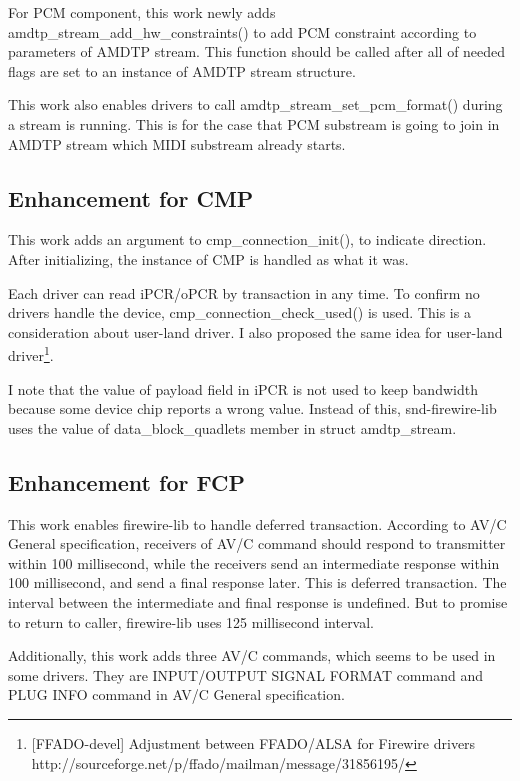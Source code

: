 \documentclass[onecolumn]{article}
\begin{document}
For PCM component, this work newly adds amdtp\_stream\_add\_hw\_constraints() to add PCM constraint according to parameters of AMDTP stream. This function should be called after all of needed flags are set to an instance of AMDTP stream structure.

This work also enables drivers to call amdtp\_stream\_set\_pcm\_format() during a stream is running. This is for the case that PCM substream is going to join in AMDTP stream which MIDI substream already starts.

\subsection{Enhancement for CMP}

This work adds an argument to cmp\_connection\_init(), to indicate direction. After initializing, the instance of CMP is handled as what it was.

Each driver can read iPCR/oPCR by transaction in any time. To confirm no drivers handle the device, cmp\_connection\_check\_used() is used. This is a consideration about user-land driver. I also proposed the same idea for user-land driver\footnote{[FFADO-devel] Adjustment between FFADO/ALSA for Firewire drivers  http://sourceforge.net/p/ffado/mailman/message/31856195/}.

I note that the value of payload field in iPCR is not used to keep bandwidth because some device chip reports a wrong value. Instead of this, snd-firewire-lib uses the value of data\_block\_quadlets member in struct amdtp\_stream.

\subsection{Enhancement for FCP}

This work enables firewire-lib to handle deferred transaction. According to AV/C General specification\cite{avc-general-4-2}, receivers of AV/C command should respond to transmitter within 100 millisecond, while the receivers send an intermediate response within 100 millisecond, and send a final response later. This is deferred transaction. The interval between the intermediate and final response is undefined. But to promise to return to caller, firewire-lib uses 125 millisecond interval.

Additionally, this work adds three AV/C commands, which seems to be used in some drivers. They are INPUT/OUTPUT SIGNAL FORMAT command and PLUG INFO command in AV/C General specification\cite{avc-general-4-2}.
\end{document}
